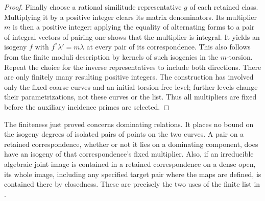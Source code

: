 \begin{proof}
Finally choose a rational similitude representative $g$ of each
retained class.  Multiplying it by a positive integer clears its
matrix denominators.  Its multiplier $m$ is then a positive
integer: applying the equality of alternating forms to a pair
of integral vectors of pairing one shows that the multiplier
is integral.  It yields an isogeny $f$ with
$f^*\lambda'=m\lambda$ at every pair of its correspondence.
This also follows from the finite moduli description by kernels
of such isogenies in the $m$-torsion.  Repeat the choice for the
inverse representatives to include both directions.  There are
only finitely many resulting positive integers.  The construction
has involved only the fixed coarse curves and an initial torsion-free
level; further levels change their parametrizations, not these
curves or the list.  Thus all multipliers are fixed before the
auxiliary incidence primes are selected.
\end{proof}

The finiteness just proved concerns dominating relations.  It places
no bound on the isogeny degrees of isolated pairs of points on the
two curves.  A pair on a retained correspondence, whether or not it
lies on a dominating component, does have an isogeny of that
correspondence's fixed multiplier.  Also, if an irreducible
algebraic joint image is contained in a retained correspondence on
a dense open, its whole image, including any specified target
pair where the maps are defined, is contained there by closedness.
These are precisely the two uses of the finite list in
.
